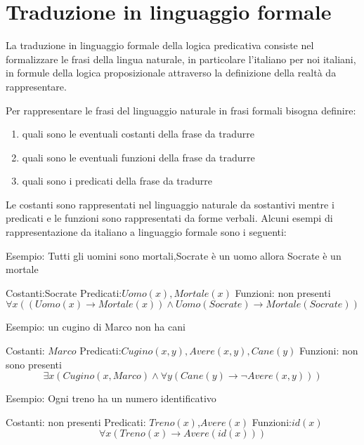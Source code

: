 \section{Traduzione in linguaggio formale}
La traduzione in linguaggio formale della logica predicativa consiste nel formalizzare
le frasi della lingua naturale, in particolare l'italiano per noi italiani, in
formule della logica proposizionale attraverso la definizione della realtà da rappresentare.

Per rappresentare le frasi del linguaggio naturale in frasi formali bisogna definire:
\begin{enumerate}
    \item quali sono le eventuali costanti della frase da tradurre
    \item quali sono le eventuali funzioni della frase da tradurre
    \item quali sono i predicati della frase da tradurre
\end{enumerate}

Le costanti sono rappresentati nel linguaggio naturale da sostantivi mentre i
predicati e le funzioni sono rappresentati da forme verbali.
Alcuni esempi di rappresentazione da italiano a linguaggio formale sono i seguenti:

Esempio: Tutti gli uomini sono mortali,Socrate è un uomo allora Socrate è un mortale

Costanti:Socrate \newline
Predicati:$Uomo(x),Mortale(x)$ \newline
Funzioni: non presenti \newline
\begin{equation*}
\forall x ((Uomo(x) \rightarrow Mortale(x)) \land Uomo(Socrate) \rightarrow Mortale(Socrate))
\end{equation*}

Esempio: un cugino di Marco non ha cani

Costanti: $Marco$\newline
Predicati:$Cugino(x,y),Avere(x,y),Cane(y)$\newline
Funzioni: non sono presenti
\begin{equation*}
\exists x (Cugino(x,Marco) \land \forall y (Cane(y) \rightarrow \neg Avere(x,y)))
\end{equation*}

Esempio: Ogni treno ha un numero identificativo

Costanti: non presenti \newline
Predicati: $Treno(x)$,$Avere(x)$\newline
Funzioni:$id(x)$
\begin{equation*}
\forall x (Treno(x) \rightarrow Avere(id(x)))
\end{equation*}

